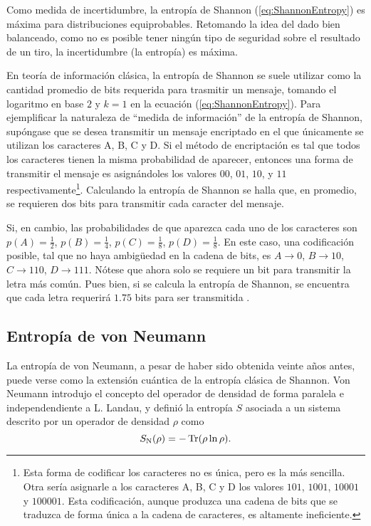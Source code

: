 Como medida de incertidumbre, la entropía de Shannon (\ref{eq:ShannonEntropy}) es máxima para distribuciones equiprobables. Retomando la idea del dado bien balanceado, como no es posible tener ningún tipo de seguridad sobre el resultado de un tiro, la incertidumbre (la entropía) es máxima.


En teoría de información clásica, la entropía de Shannon se suele utilizar como la cantidad promedio de bits requerida para trasmitir un mensaje, tomando el logaritmo en base $2$ y $k=1$ en la ecuación (\ref{eq:ShannonEntropy}). Para ejemplificar la naturaleza de ``medida de información'' de la entropía de Shannon, supóngase que se desea transmitir un mensaje encriptado en el que únicamente se utilizan los caracteres A, B, C y D. Si el método de encriptación es tal que todos los caracteres tienen la misma probabilidad de aparecer, entonces una forma de transmitir el mensaje es asignándoles los valores $00$, $01$, $10$, y $11$ respectivamente\footnote{Esta forma de codificar los caracteres no es única, pero es la más sencilla. Otra sería asignarle a los caracteres A, B, C y D los valores $101$, $1001$, $10001$ y $100001$. Esta codificación, aunque produzca una cadena de bits que se traduzca de forma única a la cadena de caracteres, es altamente ineficiente. }. Calculando la entropía de Shannon se halla que, en promedio, se requieren dos bits para transmitir cada caracter del mensaje. 

Si, en cambio, las probabilidades de que aparezca cada uno de los caracteres son $p(A)=\frac{1}{2}$, $p(B)=\frac{1}{4}$, $p(C)=\frac{1}{8}$, $p(D)=\frac{1}{8}$. En este caso, una codificación posible, tal que no haya ambigüedad en la cadena de bits, es $A \rightarrow 0$, $B\rightarrow 10$, $C\rightarrow 110$, $D\rightarrow 111$. Nótese que ahora solo se requiere un bit para transmitir la letra más común. Pues bien, si se calcula la entropía de Shannon, se encuentra que cada letra requerirá $1.75$ bits para ser transmitida \cite{Cryptography}.

\subsection{Entropía de von Neumann}

La entropía de von Neumann, a pesar de haber sido obtenida veinte años antes, puede verse como la extensión cuántica de la entropía clásica de Shannon. Von Neumann introdujo el concepto del operador de densidad de forma paralela e independendiente a L. Landau, y definió la entropía $S$ asociada a un sistema descrito por un operador de densidad $\rho$ como \cite{vonNeumann}
\begin{equation}\label{eq:VonNeumannEntropy}
    S_{\text{N}}(\rho)=-\Tr(\rho\ln{\rho}).
\end{equation}

